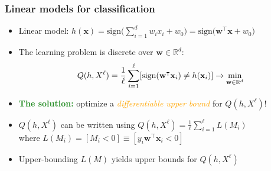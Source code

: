 \documentclass[usenames,dvipsnames,aspectratio=169]{beamer}
\begin{document}
\begin{frame}
\frametitle{Linear models for classification}

\vspace{-10mm}

\vspace{-20mm}
\begin{itemize}

\item Linear model: 
$h(\mathbf{x}) = 
\mbox{sign} \big(\sum\limits_{i=1}^d w_i x_i + w_0\big) = 
\mbox{sign} \big(\mathbf{w}^{\intercal} \mathbf{x} + w_0\big)$

\item The learning problem is discrete
over $\mathbf{w} \in \mathbb{R}^d$:
\vspace{-2mm}
\[
    Q(h, X^{\ell}) = \frac {1} {\ell} 
    \sum\limits_{i=1} ^{\ell}     
        [\mbox{sign} (\mathbf{w}^{\intercal} \mathbf{x}_i)
           \neq h(\mathbf{x}_i)]
    \to \min\limits_{\mathbf{w} \in \mathbb{R}^d}
\vspace{-1mm}
\]

\item \textcolor{ForestGreen}{\textbf{The solution:}} optimize 
a 
\textcolor{orange}{\textit{differentiable upper bound}} for $Q(h, X^{\ell})$!

\pause
\item $Q(h, X^{\ell})$ can be written using 
$Q(h, X^{\ell}) = \frac {1} {\ell} \sum\limits_{i=1} ^{\ell} L(M_i)$\\
where $L(M_i) = [M_i < 0] 
\equiv [y_i \mathbf{w}^{\intercal} \mathbf{x}_i < 0]$

\item Upper-bounding $L(M)$ yields upper bounds for $Q(h, X^{\ell})$ 

\end{itemize}

\end{frame}
\end{document}

